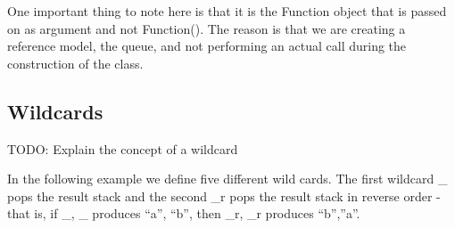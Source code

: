 \documentclass[letterpaper,10pt,english]{sphinxmanual}
\begin{document}
One important thing to note here is that it is the Function object that
is passed on as argument and not Function(). The reason is that we are
creating a reference model, the queue, and not performing an actual call
during the construction of the class.


\subsection{Wildcards}
\label{tutorial:wildcards}
TODO: Explain the concept of a wildcard

In the following example we define five different wild cards.
The first wildcard \_ pops the result stack and the second \_r pops the
result stack in reverse order - that is, if \_, \_ produces ``a'', ``b'', then
\_r, \_r produces ``b'',''a''.
\end{document}
